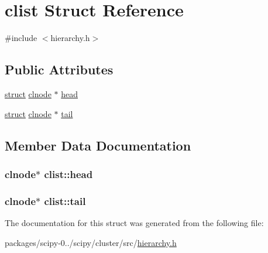 \hypertarget{structclist}{}\section{clist Struct Reference}
\label{structclist}


{\ttfamily \#include $<$hierarchy.\+h$>$}

\subsection*{Public Attributes}
\begin{DoxyCompactItemize}
\item 
\hyperlink{gen__mat5files_8m_aa5a86657308844fba3fe81ef5286ca5f}{struct} \hyperlink{structclnode}{clnode} $\ast$ \hyperlink{structclist_a84529ced0d53d58b4f8bf7e5f2a74d94}{head}
\item 
\hyperlink{gen__mat5files_8m_aa5a86657308844fba3fe81ef5286ca5f}{struct} \hyperlink{structclnode}{clnode} $\ast$ \hyperlink{structclist_a9d0bab3b38209e902e5630cfd09c94be}{tail}
\end{DoxyCompactItemize}


\subsection{Member Data Documentation}
\hypertarget{structclist_a84529ced0d53d58b4f8bf7e5f2a74d94}{}
\subsubsection[{head}]{ {\bf clnode}$\ast$ clist\+::head}\label{structclist_a84529ced0d53d58b4f8bf7e5f2a74d94}
\hypertarget{structclist_a9d0bab3b38209e902e5630cfd09c94be}{}
\subsubsection[{tail}]{ {\bf clnode}$\ast$ clist\+::tail}\label{structclist_a9d0bab3b38209e902e5630cfd09c94be}


The documentation for this struct was generated from the following file\+:\begin{DoxyCompactItemize}
\item 
packages/scipy-\/0../scipy/cluster/src/\hyperlink{hierarchy_8h}{hierarchy.\+h}\end{DoxyCompactItemize}
